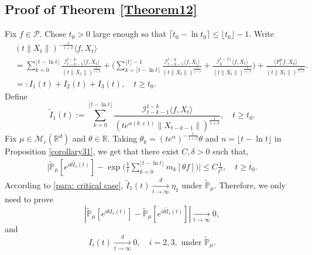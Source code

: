 \documentclass[12pt,a4paper]{amsart}
\theoremstyle{plain}
\theoremstyle{definition}
\numberwithin{equation}{section}
\begin{document}
\subsection{Proof of Theorem \ref{Theorem12}}
\label{sec: proof of thm 1.3}
    Fix $f\in\mathcal{P}$.
    Chose $t_0 > 0$ large enough so that $\lceil t_0-\ln t_0\rceil \leq \lfloor t_0 \rfloor - 1.$
    Write
    \begin{align*}
        &(t\|X_t\|)^{-\frac{1}{1+\beta}}\langle f,X_t\rangle
        \\ &=\sum_{k=0}^{\lfloor t-\ln t \rfloor} \frac{\mathcal I_{t-k-1}^{t-k}\langle f ,X_t\rangle}{(t\|X_t\|)^{\frac{1}{1+\beta}}}+\Big(\sum_{k=\lceil t-\ln t \rceil}^{\lfloor t \rfloor-1} \frac{\mathcal I_{t-k-1}^{t-k}\langle f ,X_t\rangle}{(t\|X_t\|)^{\frac{1}{1+\beta}}}+\frac{\mathcal I_0^{t-\lfloor t \rfloor}\langle f ,X_t\rangle}{(t\|X_t\|)^{\frac{1}{1+\beta}}}\Big) + 
         \frac{\langle P^\alpha_tf,X_0\rangle}{(t\|X_t\|)^{\frac{1}{1+\beta}}}.
        \\&=:I_1(t)+I_2(t) + I_3(t),
        \quad t\geq t_0.
    \end{align*}
    Define
\[
    \tilde I_1(t)
    :=\sum_{k=0}^{\lfloor t-\ln t \rfloor}\frac{\mathcal I_{t-k-1}^{t-k}\langle f ,X_t\rangle}{(t e^{\alpha(k+1)}\|X_{t-k-1}\|)^{\frac{1}{1+\beta}}},
    \quad t\geq t_0.
\]
    Fix $\mu \in \mathcal M_c(\mathbb R^d)$ and $\theta\in \mathbb R$. Taking $\theta_k=(t e^{\alpha})^{-\frac{1}{1+\beta}} \theta $ and $n={\lfloor t-\ln t \rfloor}$ 
    in Proposition \ref{corollary31},
    we get that there exist $C,\delta>0$ such that,
\begin{align*}
        \Big|\mathbb{\tilde{P}}_{\mu} [e^{i\theta\tilde{I}_1(t)}]-\exp\Big(\frac{1}{t}\sum_{k=0}^{\lfloor t-\ln t \rfloor}m_k[\theta f]\Big)\Big|\leq C \frac{1}{t^{\delta}},
        \quad t\geq t_0.
\end{align*}
    According to \eqref{para: critical case},  $\tilde{I}_1(t)\xrightarrow[t\to \infty]{d}\eta_1$ under $\tilde {\mathbb P}_\mu$.
    Therefore, we only need to prove
 \begin{equation}\label{toprove-1}|\mathbb{\tilde{P}}_{\mu}[e^{i\theta I_1(t)}]-\mathbb{\tilde{P}}_{\mu}[e^{i\theta\tilde{I}_1(t)}]|\xrightarrow[t\to \infty]{} 0,
 \end{equation}
      and 
     \begin{equation}\label{toprove-2}
     I_i(t)\xrightarrow[t\to \infty]{d} 0,\quad i = 2,3,  \mbox{ under } \tilde {\mathbb P}_\mu.\end{equation}
      
\end{document}
